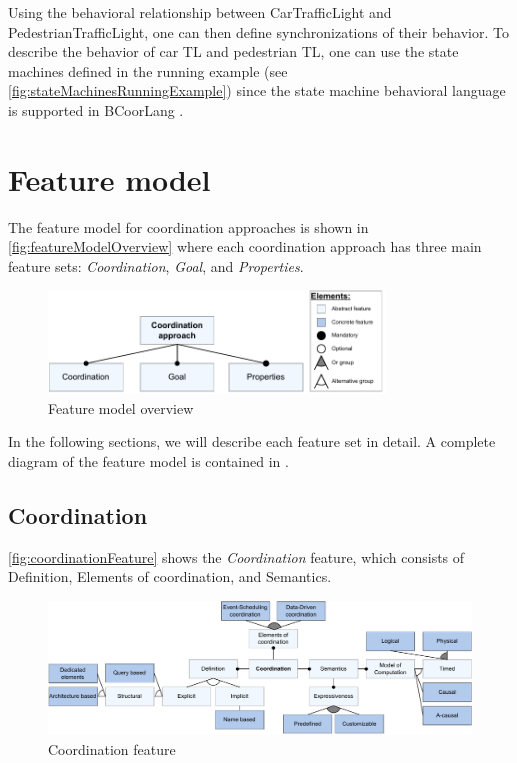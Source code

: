 \documentclass[runningheads]{llncs}
\begin{document}
Using the behavioral relationship between \textsf{CarTrafficLight} and \textsf{PedestrianTrafficLight}, one can then define synchronizations of their behavior.
To describe the behavior of car TL and pedestrian TL, one can use the state machines defined in the running example (see \autoref{fig:stateMachinesRunningExample}) since the state machine behavioral language is supported in BCoorLang \cite{krauterBehavioralConsistencyMultimodeling2023}.


\section{Feature model} \label{sec:features}
The feature model for coordination approaches is shown in \autoref{fig:featureModelOverview} where each coordination approach has three main feature sets: \textit{Coordination}, \textit{Goal}, and \textit{Properties}.

\begin{figure}[ht]
	\centering
	\includegraphics[width=0.8\textwidth]{images/root}
	\caption{Feature model overview}
	\label{fig:featureModelOverview}
\end{figure}

In the following sections, we will describe each feature set in detail.
A complete diagram of the feature model is contained in \cite{anonymousauthorsCoordination2024Artifacts2024}.

\subsection{Coordination}

\autoref{fig:coordinationFeature} shows the \textit{Coordination} feature, which consists of \textsf{Definition}, \textsf{Elements of coordination}, and \textsf{Semantics}.

\begin{figure}[ht]
	\centering
	\includegraphics[width=1\textwidth]{images/coordination_feature}
	\caption{Coordination feature}
	\label{fig:coordinationFeature}
\end{figure}
\end{document}
